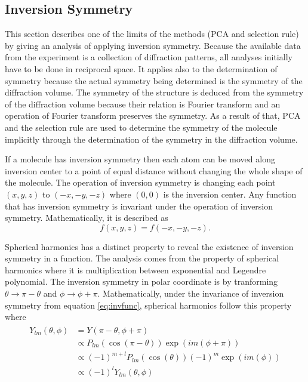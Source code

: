 \subsection{Inversion Symmetry}
This section describes one of the limits of the methods (PCA and selection rule) by giving an analysis of applying inversion symmetry. Because the available data from the experiment is a collection of diffraction patterns, all analyses initially have to be done in reciprocal space. It applies also to the determination of symmetry because the actual symmetry being determined is the symmetry of the diffraction volume. The symmetry of the structure is deduced from the symmetry of the diffraction volume because their relation is Fourier transform and an operation of Fourier transform preserves the symmetry. As a result of that, PCA and the selection rule are used to determine the symmetry of the molecule implicitly through the determination of the symmetry in the diffraction volume.

If a molecule has inversion symmetry then each atom can be moved along inversion center to a point of equal distance without changing the whole shape of the molecule. The operation of inversion symmetry is changing each point $(x,y,z)$ to $(-x,-y,-z)$ where $(0,0)$ is the inversion center. Any function that has inversion symmetry is invariant under the operation of inversion symmetry.  Mathematically, it is described as
\begin{equation}
f(x,y,z)=f(-x,-y,-z). 
\label{eq:invfunc}
\end{equation}

Spherical harmonics has a distinct property to reveal the existence of inversion symmetry in a function. The analysis comes from the property of spherical harmonics where it is multiplication between exponential and Legendre polynomial. The inversion symmetry in polar coordinate is by tranforming $\theta \rightarrow \pi-\theta$ and $\phi \rightarrow \phi+\pi$. Mathematically, under the invariance of inversion symmetry from equation \ref{eq:invfunc}, spherical harmonics follow this property where
\begin{align}
\begin{split}
Y_{lm}(\theta,\phi)&=Y(\pi-\theta,\phi+\pi) \\
&\propto P_{lm}(\cos(\pi-\theta)) \exp(i m (\phi+\pi)) \\
&\propto  (-1)^{m+l} P_{lm}(\cos(\theta)) (-1)^m \exp(i m (\phi)) \\
&\propto  (-1)^{l} Y_{lm}(\theta,\phi) \\
\end{split}
\label{eq:sphinver}
\end{align}

